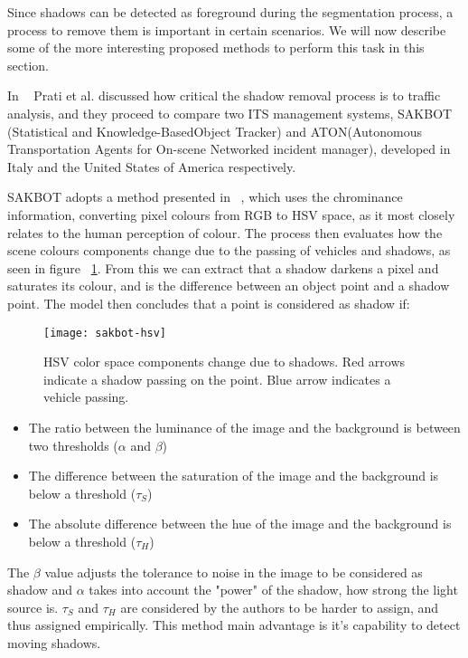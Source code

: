 Since shadows can be detected as foreground during the segmentation process, a process to remove them is important in certain scenarios. We will now describe some of the more interesting proposed methods to perform this task in this section.

In ~\cite{prati_shadow_2001} Prati et al. discussed how critical the shadow removal process is to traffic analysis, and they proceed to compare two ITS  management systems, SAKBOT (Statistical and Knowledge-BasedObject Tracker) and ATON(Autonomous Transportation Agents for On-scene Networked incident manager), developed in Italy and the United States of America respectively.

SAKBOT adopts a method presented in ~\cite{cucchiara_statistic_2000}, which uses the chrominance information, converting pixel colours from RGB to HSV space, as it most closely relates to the human perception of colour. The process then evaluates how the scene colours components change due to the passing of vehicles and shadows, as seen in figure ~\ref{fig:sakbot-hsv}. From this we can extract that a shadow darkens a pixel and saturates its colour, and is the difference between an object point and a shadow point. The model then concludes that a point is considered as shadow if:

\begin{figure}[h]
  \begin{center}
    \leavevmode
    \texttt{[image: sakbot-hsv]}
    \captionsetup{justification=centering}
    \caption{HSV color space components change due to shadows. Red arrows indicate a shadow passing on the point. Blue arrow indicates a vehicle passing. ~\cite{prati_shadow_2001}}
    \label{fig:sakbot-hsv}
  \end{center}
\end{figure}

\begin{itemize}
	\item The ratio between the luminance of the image and the background is between two thresholds ($\alpha$ and $\beta$)
	\item The difference between the saturation of the image and the background is below a threshold ($\tau_{S}$)
	\item The absolute difference between the hue of the image and the background is below a threshold ($\tau_{H}$)
\end{itemize}

The $\beta$ value adjusts the tolerance to noise in the image to be considered as shadow and $\alpha$ takes into account the "power" of the shadow, how strong the light source is. $\tau_{S}$ and $\tau_{H}$ are considered by the authors to be harder to assign, and thus assigned empirically. This method main advantage is it's capability to detect moving shadows.

